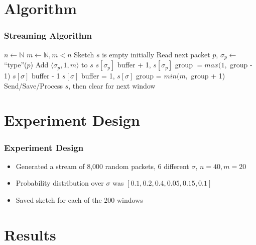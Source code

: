 \documentclass{beamer}
\begin{document}
\section{Algorithm}
\begin{frame}
  \frametitle{Streaming Algorithm}
  \begin{algorithm}[H]
    \tiny
    \caption{$\mathcal{A}$}
    \begin{algorithmic}[1]
      \State $n \gets \mathbb{N}$ 
      \State $m \gets \mathbb{N}, m < n$ 
      \State Sketch $s$ is empty initially
          \State Read next packet $p$, $\sigma_p \gets$ ``type''($p$) 
            \State Add $\langle \sigma_p, 1, m  \rangle$ to $s$ 
            \Else
            \State $s[\sigma_p]$ buffer + 1, $s[\sigma_p]$ group $= max(1,$ group - 1)
          \EndIf
            \State $s[\sigma]$ buffer - 1
              \State $s[\sigma]$ buffer = 1, $s[\sigma]$ group = $min(m,$ group + 1)
            \EndIf
          \EndFor
        \EndFor
        \State Send/Save/Process $s$, then clear for next window  
      \EndWhile
    \end{algorithmic}
  \end{algorithm}
\end{frame}

\section{Experiment Design}
\begin{frame}
  \frametitle{Experiment Design}
  \begin{itemize}
    \item<2-> Generated a stream of 8,000 random packets, 6 different $\sigma$, $n = 40, m = 20$
    \item<3-> Probability distribution over $\sigma$ was $[0.1,0.2,0.4,0.05,0.15,0.1]$
    \item<4-> Saved sketch for each of the 200 windows
  \end{itemize}
\end{frame}

\section{Results}
\end{document}
